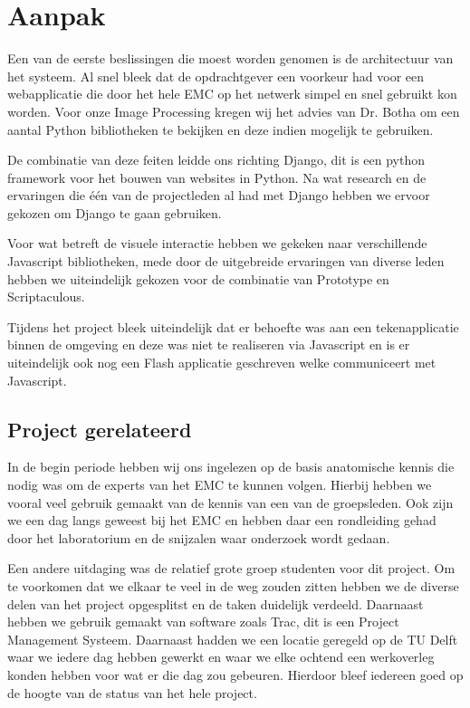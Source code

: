 \section{Aanpak}
\label{Aanpak}
Een van de eerste beslissingen die moest worden genomen is de architectuur van het systeem. Al snel bleek dat de opdrachtgever een voorkeur had voor een webapplicatie die door het hele EMC op het netwerk simpel en snel gebruikt kon worden. 
Voor onze Image Processing kregen wij het advies van Dr. Botha om een aantal Python bibliotheken te bekijken en deze indien mogelijk te gebruiken. 

De combinatie van deze feiten leidde ons richting Django, dit is een python framework voor het bouwen van websites in Python. Na wat research en de ervaringen die \'{e}\'{e}n van de projectleden al had met Django hebben we ervoor gekozen om Django te gaan gebruiken. 

Voor wat betreft de visuele interactie hebben we gekeken naar verschillende Javascript bibliotheken, mede door de uitgebreide ervaringen van diverse leden hebben we uiteindelijk gekozen voor de combinatie van Prototype en Scriptaculous.

Tijdens het project bleek uiteindelijk dat er behoefte was aan een tekenapplicatie binnen de omgeving en deze was niet te realiseren via Javascript en is er uiteindelijk ook nog een Flash applicatie geschreven welke communiceert met Javascript.

\subsection{Project gerelateerd}
In de begin periode hebben wij ons ingelezen op de basis anatomische kennis die nodig was om de experts van het EMC te kunnen volgen. Hierbij hebben we vooral veel gebruik gemaakt van de kennis van een van de groepsleden. Ook zijn we een dag langs geweest bij het EMC en hebben daar een rondleiding gehad door het laboratorium en de snijzalen waar onderzoek wordt gedaan. 

Een andere uitdaging was de relatief grote groep studenten voor dit project. Om te voorkomen dat we elkaar te veel in de weg zouden zitten hebben we de diverse delen van het project opgesplitst en de taken duidelijk verdeeld. Daarnaast hebben we gebruik gemaakt van software zoals Trac, dit is een Project Management Systeem. Daarnaast hadden we een locatie geregeld op de TU Delft waar we iedere dag hebben gewerkt en waar we elke ochtend een werkoverleg konden hebben voor wat er die dag zou gebeuren. Hierdoor bleef iedereen goed op de hoogte van de status van het hele project.
